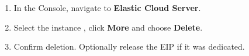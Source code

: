 \documentclass{guide}
\begin{document}
\begin{objectives}
\end{objectives}

\stepbystep
\begin{enumerate}
  \item In the Console, navigate to \textbf{Elastic Cloud Server}.
  \item Select the instance , click \textbf{More} and
        choose \textbf{Delete}.
  \item Confirm deletion. Optionally release the EIP if it was dedicated.
\end{enumerate}

\end{document}
